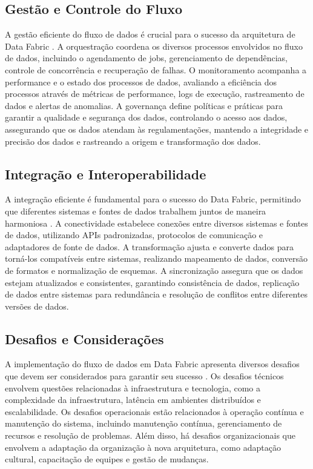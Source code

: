 \subsection{Gestão e Controle do Fluxo}
A gestão eficiente do fluxo de dados é crucial para o sucesso da arquitetura de Data Fabric \cite{gade2024data}. A orquestração coordena os diversos processos envolvidos no fluxo de dados, incluindo o agendamento de jobs, gerenciamento de dependências, controle de concorrência e recuperação de falhas. O monitoramento acompanha a performance e o estado dos processos de dados, avaliando a eficiência dos processos através de métricas de performance, logs de execução, rastreamento de dados e alertas de anomalias.
A governança define políticas e práticas para garantir a qualidade e segurança dos dados, controlando o acesso aos dados, assegurando que os dados atendam às regulamentações, mantendo a integridade e precisão dos dados e rastreando a origem e transformação dos dados.
\subsection{Integração e Interoperabilidade}
A integração eficiente é fundamental para o sucesso do Data Fabric, permitindo que diferentes sistemas e fontes de dados trabalhem juntos de maneira harmoniosa \cite{barik2022data}. A conectividade estabelece conexões entre diversos sistemas e fontes de dados, utilizando APIs padronizadas, protocolos de comunicação e adaptadores de fonte de dados. A transformação ajusta e converte dados para torná-los compatíveis entre sistemas, realizando mapeamento de dados, conversão de formatos e normalização de esquemas.
A sincronização assegura que os dados estejam atualizados e consistentes, garantindo consistência de dados, replicação de dados entre sistemas para redundância e resolução de conflitos entre diferentes versões de dados.
\subsection{Desafios e Considerações}
A implementação do fluxo de dados em Data Fabric apresenta diversos desafios que devem ser considerados para garantir seu sucesso \cite{addagada2022best}. Os desafios técnicos envolvem questões relacionadas à infraestrutura e tecnologia, como a complexidade da infraestrutura, latência em ambientes distribuídos e escalabilidade. Os desafios operacionais estão relacionados à operação contínua e manutenção do sistema, incluindo manutenção contínua, gerenciamento de recursos e resolução de problemas.
Além disso, há desafios organizacionais que envolvem a adaptação da organização à nova arquitetura, como adaptação cultural, capacitação de equipes e gestão de mudanças.


